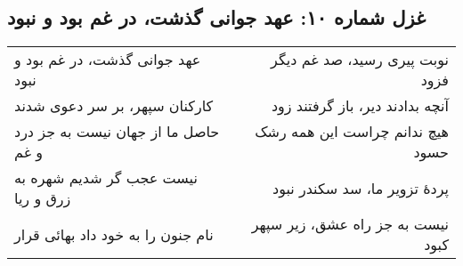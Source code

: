 \begin{center}
\section*{غزل شماره ۱۰: عهد جوانی گذشت، در غم بود و نبود}
\label{sec:010}
\begin{longtable}{l p{0.5cm} r}
عهد جوانی گذشت، در غم بود و نبود
&&
نوبت پیری رسید، صد غم دیگر فزود
\\
کارکنان سپهر، بر سر دعوی شدند
&&
آنچه بدادند دیر، باز گرفتند زود
\\
حاصل ما از جهان نیست به جز درد و غم
&&
هیچ ندانم چراست این همه رشک حسود
\\
نیست عجب گر شدیم شهره به زرق و ریا
&&
پردهٔ تزویر ما، سد سکندر نبود
\\
نام جنون را به خود داد بهائی قرار
&&
نیست به جز راه عشق، زیر سپهر کبود
\\
\end{longtable}
\end{center}
